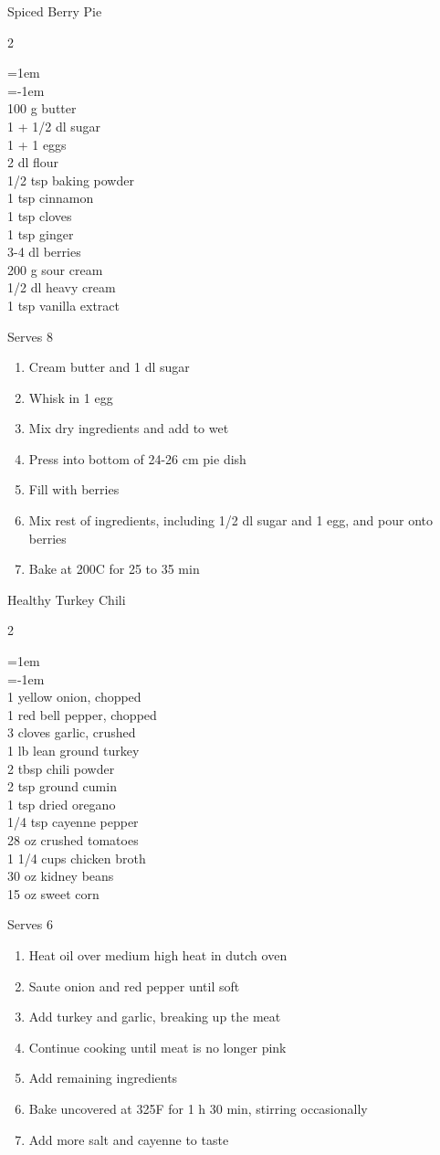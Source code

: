 \documentclass{article}
\newenvironment{recipe}[2]
    {\clearpage
    \begin{FlushLeft}
    \textrm{{\large#1}\hfill{\large\tabularnums{#2}}}
    \vspace{0.5em}
    \columnratio{0.333}
    \setlength{\columnsep}{0.2in}
    \begin{paracol}{2}}
    {\end{paracol}\end{FlushLeft}}
\newenvironment{denserecipe}[2]
    {\small
    \begin{recipe}{#1}{#2}}
    {\end{recipe}}
\newcommand{\nextcolumn}{\switchcolumn}
\newenvironment{ingredients}
    {
    \begin{obeylines}
    \vspace{\parskip}
    \setlength{\parskip}{0.25em}
    \vspace{-0.25em}
    \leftskip=1em
    \parindent=-1em}
    {\end{obeylines}}
\newenvironment{steps}
    {\begin{enumerate}[leftmargin=*,topsep=0pt]}
    {\end{enumerate}}
\newcommand{\celsius}[1]{#1\textdegree{}C}
\newcommand{\fahrenheit}[1]{#1\textdegree{}F}
\newcommand{\tag}[1]{\hspace{1em}#1}
\newcommand{\symboltag}[2]{\tag{#1\hspace{0.4em}#2}}
\newcommand{\totaltime}[1]{\symboltag{\raisebox{-0.1em}{\small\StopWatchEnd}}{#1}}
\newcommand{\preheat}[1]{\symboltag{\Topbottomheat}{#1}}
\begin{document}
\begin{denserecipe}{Spiced Berry Pie}{\tag{V}\preheat{\celsius{200}}\totaltime{1 h}}
\begin{ingredients}
100 g butter
1 + 1/2 dl sugar
1 + 1 eggs
2 dl flour
1/2 tsp baking powder
1 tsp cinnamon
1 tsp cloves
1 tsp ginger
3-4 dl berries
200 g sour cream
1/2 dl heavy cream
1 tsp vanilla extract
\end{ingredients}
\nextcolumn
Serves 8
\begin{steps}
    \item Cream butter and 1 dl sugar
    \item Whisk in 1 egg
    \item Mix dry ingredients and add to wet
    \item Press into bottom of 24-26 cm pie dish
    \item Fill with berries
    \item Mix rest of ingredients, including 1/2 dl sugar and 1 egg, and pour onto berries
    \item Bake at \celsius{200} for 25 to 35 min
\end{steps}
\end{denserecipe}

\begin{denserecipe}{Healthy Turkey Chili}{\preheat{\fahrenheit{325}\totaltime{2 h}}}
\begin{ingredients}
1 yellow onion, chopped
1 red bell pepper, chopped
3 cloves garlic, crushed
1 lb lean ground turkey
2 tbsp chili powder
2 tsp ground cumin
1 tsp dried oregano
1/4 tsp cayenne pepper
28 oz crushed tomatoes
1 1/4 cups chicken broth
30 oz kidney beans
15 oz sweet corn
\end{ingredients}
\nextcolumn
Serves 6
\begin{steps}
    \item Heat oil over medium high heat in dutch oven
    \item Saute onion and red pepper until soft
    \item Add turkey and garlic, breaking up the meat
    \item Continue cooking until meat is no longer pink
    \item Add remaining ingredients
    \item Bake uncovered at \fahrenheit{325} for 1 h 30 min, stirring occasionally
    \item Add more salt and cayenne to taste
\end{steps}
\end{denserecipe}
\end{document}
